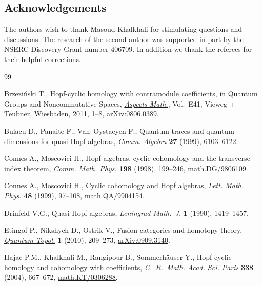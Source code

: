 \documentclass[10pt,a4paper]{amsart}
\numberwithin{equation}{section}
\begin{document}
\subsection*{Acknowledgements}

The authors wish to thank Masoud Khalkhali for stimulating questions and discussions. The research of the second author was supported in part by the NSERC Discovery Grant number 406709. In addition we thank the referees for their helpful corrections.


\begin{thebibliography}{99}
\footnotesize\itemsep=0pt

Brzezi\'nski T., Hopf-cyclic homology with contramodule coefficients, in
 Quantum Groups and Noncommutative Spaces, \href{https://doi.org/10.1007/978-3-8348-9831-9_1}{\textit{Aspects Math.}}, Vol.~E41,
 Vieweg + Teubner, Wiesbaden, 2011, 1--8, \href{https://arxiv.org/abs/0806.0389}{arXiv:0806.0389}.

Bulacu D., Panaite F., Van~Oystaeyen F., Quantum traces and quantum dimensions
 for quasi-{H}opf algebras, \href{https://doi.org/10.1080/00927879908826809}{\textit{Comm. Algebra}} \textbf{27} (1999),
 6103--6122.

Connes A., Moscovici H., Hopf algebras, cyclic cohomology and the transverse
 index theorem, \href{https://doi.org/10.1007/s002200050477}{\textit{Comm. Math. Phys.}} \textbf{198} (1998), 199--246,
 \href{https://arxiv.org/abs/math.DG/9806109}{math.DG/9806109}.

Connes A., Moscovici H., Cyclic cohomology and {H}opf algebras, \href{https://doi.org/10.1023/A:1007527510226}{\textit{Lett.
 Math. Phys.}} \textbf{48} (1999), 97--108, \href{https://arxiv.org/abs/math.QA/9904154}{math.QA/9904154}.

Drinfeld V.G., Quasi-{H}opf algebras, \textit{Leningrad Math.~J.} \textbf{1}
 (1990), 1419--1457.

Etingof P., Nikshych D., Ostrik V., Fusion categories and homotopy theory,
 \href{https://doi.org/10.4171/QT/6}{\textit{Quantum Topol.}} \textbf{1} (2010), 209--273, \href{https://arxiv.org/abs/0909.3140}{arXiv:0909.3140}.

Hajac P.M., Khalkhali M., Rangipour B., Sommerh\"auser Y., Hopf-cyclic homology
 and cohomology with coefficients, \href{https://doi.org/10.1016/j.crma.2003.11.036}{\textit{C.~R.~Math. Acad. Sci. Paris}}
 \textbf{338} (2004), 667--672, \href{https://arxiv.org/abs/math.KT/0306288}{math.KT/0306288}.


\end{thebibliography}
\end{document}
